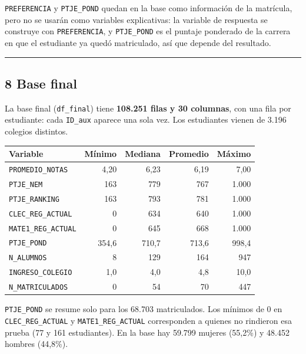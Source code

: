 \documentclass[11pt]{article}
\begin{document}
\texttt{PREFERENCIA} y \texttt{PTJE\_POND} quedan en la base como
información de la matrícula, pero no se usarán como variables
explicativas: la variable de respuesta se construye con
\texttt{PREFERENCIA}, y \texttt{PTJE\_POND} es el puntaje ponderado de
la carrera en que el estudiante ya quedó matriculado, así que depende
del resultado.

\medskip\hrule\medskip

\subsection*{8 \; Base final}

La base final (\texttt{df\_final}) tiene \textbf{108.251 filas y 30
columnas}, con una fila por estudiante: cada \texttt{ID\_aux} aparece una
sola vez. Los estudiantes vienen de 3.196 colegios distintos.

\begin{center}
\begin{tabular}{lrrrr}
\toprule
\textbf{Variable} & \textbf{Mínimo} & \textbf{Mediana} & \textbf{Promedio} & \textbf{Máximo} \\
\midrule
\texttt{PROMEDIO\_NOTAS}   & 4,20  & 6,23  & 6,19  & 7,00 \\
\texttt{PTJE\_NEM}         & 163   & 779   & 767   & 1.000 \\
\texttt{PTJE\_RANKING}     & 163   & 793   & 781   & 1.000 \\
\texttt{CLEC\_REG\_ACTUAL} & 0     & 634   & 640   & 1.000 \\
\texttt{MATE1\_REG\_ACTUAL}& 0     & 645   & 668   & 1.000 \\
\texttt{PTJE\_POND}        & 354,6 & 710,7 & 713,6 & 998,4 \\
\texttt{N\_ALUMNOS}        & 8     & 129   & 164   & 947 \\
\texttt{INGRESO\_COLEGIO}  & 1,0   & 4,0   & 4,8   & 10,0 \\
\texttt{N\_MATRICULADOS}   & 0     & 54    & 70    & 447 \\
\bottomrule
\end{tabular}
\end{center}

\texttt{PTJE\_POND} se resume solo para los 68.703 matriculados. Los
mínimos de 0 en \texttt{CLEC\_REG\_ACTUAL} y \texttt{MATE1\_REG\_ACTUAL}
corresponden a quienes no rindieron esa prueba (77 y 161 estudiantes).
En la base hay 59.799 mujeres (55,2\%) y 48.452 hombres (44,8\%).
\end{document}
